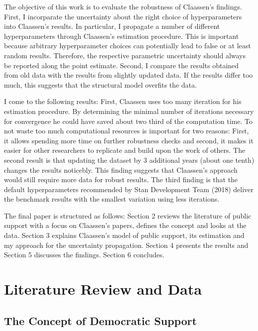 \documentclass[12pt,english,a4paper,oneside]{article}
\theoremstyle{definition}
\theoremstyle{definition}
\theoremstyle{definition}
\theoremstyle{definition}
\theoremstyle{remark}
\begin{document}
The objective of this work is to evaluate the robustness of Claassen's findings. First, I incorparate the uncertainty about the right choice of hyperparameters into Claassen's results. In particular, I propagate a number of different hyperparameters through Claassen's estimation procedure. This is important because arbitrary hyperparameter choices can potentially lead to false or at least random results. Therefore, the respective parametric uncertainty should always be reported along the point estimate. Second, I compare the results obtained from old data with the results from slightly updated data. If the results differ too much, this suggests that the structural model overfits the data.

I come to the following results: First, Claassen uses too many iteration for his estimation procedure. By determining the minimal number of iterations necessary for convergence he could have saved about two third of the computation time. To not waste too much computational resources is important for two reasons: First, it allows spending more time on further robustness checks and second, it makes it easier for other researchers to replicate and build upon the work of others. The second result is that updating the dataset by 3 additional years (about one tenth) changes the results noticebly. This finding suggests that Claassen's approach would still require more data for robust results. The third finding is that the default hyperparameters recommended by Stan Development Team (2018) deliver the benchmark results with the smallest variation using less iterations.

The final paper is structured as follows: Section 2 reviews the literature of public support with a focus on Claassen's papers, defines the concept and looks at the data. Section 3 explains Claassen's model of public support, its estimation and my approach for the uncertainty propagation. Section 4 presents the results and Section 5 discusses the findings. Section 6 concludes.

\hypertarget{literature-review-and-data}{%
\section{Literature Review and Data}\label{literature-review-and-data}}

\hypertarget{the-concept-of-democratic-support}{%
\subsection{The Concept of Democratic Support}\label{the-concept-of-democratic-support}}
\end{document}
